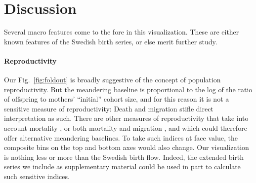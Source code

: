 \documentclass{article}
\newcommand\todo[1]{\textcolor{red}{[TODO: #1]}}
\begin{document}

\section{Discussion}
Several macro features come to the fore in this visualization. These are either known features of the Swedish birth series, or else merit further study. %

\paragraph{Reproductivity}
Our Fig.~\ref{fig:foldout} is broadly suggestive of the concept of population reproductivity. But the meandering baseline is proportional to the log of the ratio of offspring to mothers' ``initial'' cohort size, and for this reason it is not a sensitive measure of reproductivity: Death and migration stifle direct interpretation as such. There are other measures of reproductivity that take into account mortality \citep{kuczynski1932fertility}, or both mortality and migration \citep[][inter alia]{hyrenius1951reproduction,ortega2007birth,preston2007intrinsic,wilson2013migration,ediev2014new}, and which could therefore offer alternative meandering baselines. To take such indices at face value, the composite bins on the top and bottom axes would also change. Our visualization is nothing less or more than the Swedish birth flow. Indeed, the extended birth series we include as supplementary material could be used in part to calculate such sensitive indices. 
\end{document}
